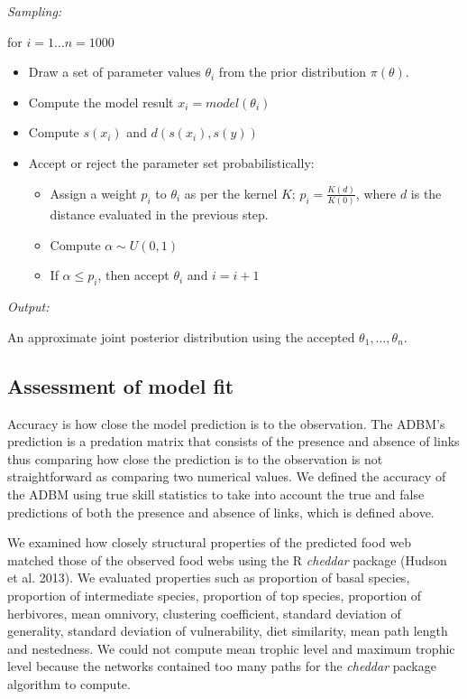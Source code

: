 \documentclass{article}
\begin{document}
\emph{Sampling:}

for \(i = 1 \dots n = 1000\)

\begin{itemize}
\item
  Draw a set of parameter values \(\theta_i\) from the prior
  distribution \(\pi(\theta)\).
\item
  Compute the model result \(x_i = model(\theta_i)\)
\item
  Compute \(s(x_i)\) and \(d(s(x_i), s(y))\)
\item
  Accept or reject the parameter set probabilistically:

  \begin{itemize}
  \item
    Assign a weight \(p_i\) to \(\theta_i\) as per the kernel \(K\);
    \(p_i = \frac{K(d)}{K(0)}\), where \(d\) is the distance evaluated
    in the previous step.
  \item
    Compute \(\alpha \sim U(0,1)\)
  \item
    If \(\alpha \leq p_i\), then accept \(\theta_i\) and \(i = i + 1\)
  \end{itemize}
\end{itemize}

\emph{Output:}

An approximate joint posterior distribution using the accepted
\(\theta_1, \dots, \theta_n\).

\hypertarget{assessment-of-model-fit}{%
\subsection{Assessment of model fit}\label{assessment-of-model-fit}}

Accuracy is how close the model prediction is to the observation. The
ADBM's prediction is a predation matrix that consists of the presence
and absence of links thus comparing how close the prediction is to the
observation is not straightforward as comparing two numerical values. We
defined the accuracy of the ADBM using true skill statistics to take
into account the true and false predictions of both the presence and
absence of links, which is defined above.

We examined how closely structural properties of the predicted food web
matched those of the observed food webs using the R \emph{cheddar}
package (Hudson et al. 2013). We evaluated properties such as proportion
of basal species, proportion of intermediate species, proportion of top
species, proportion of herbivores, mean omnivory, clustering
coefficient, standard deviation of generality, standard deviation of
vulnerability, diet similarity, mean path length and nestedness. We
could not compute mean trophic level and maximum trophic level because
the networks contained too many paths for the \emph{cheddar} package
algorithm to compute.
\end{document}
